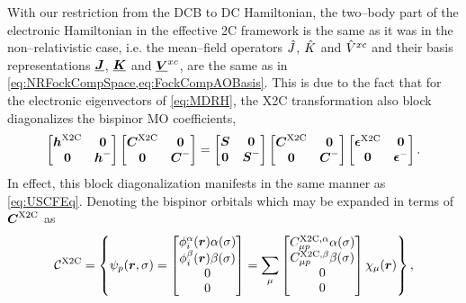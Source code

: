 With our restriction from the DCB to DC Hamiltonian,
the two--body part of the electronic Hamiltonian in the effective 2C framework
is the same as it was in the non--relativistic case, i.e. the mean--field operators
$\hat{J}$, $\hat{K}$ and $\hat{V}^{xc}$ and their basis representations $\boldsymbol{\underline{J}}$, $\boldsymbol{\underline{K}}$ and $\boldsymbol{\underline{V}}^{xc}$, are the same as in 
\cref{eq:NRFockCompSpace,eq:FockCompAOBasis}. This is due to the fact that for the electronic
eigenvectors of \cref{eq:MDRH}, the X2C transformation also block diagonalizes the 
bispinor MO coefficients,
\begin{equation}
\begin{bmatrix} \boldsymbol{h}^{\mathrm{X2C}} & \boldsymbol{0} \\ \boldsymbol{0} & \boldsymbol{h}^- \end{bmatrix}
\begin{bmatrix} \boldsymbol{C}^{\mathrm{X2C}} & \boldsymbol{0} \\ \boldsymbol{0} & \boldsymbol{C}^- \end{bmatrix} =
\begin{bmatrix} \boldsymbol{S} & \boldsymbol{0} \\ \boldsymbol{0} & \boldsymbol{S}^- \end{bmatrix}
\begin{bmatrix} \boldsymbol{C}^{\mathrm{X2C}} & \boldsymbol{0} \\ \boldsymbol{0} & \boldsymbol{C}^- \end{bmatrix} 
\begin{bmatrix} \boldsymbol{\epsilon}^{\mathrm{X2C}} & \boldsymbol{0} \\ \boldsymbol{0} & \boldsymbol{\epsilon}^- \end{bmatrix}.
\end{equation}
In effect, this block diagonalization manifests in the same manner as \cref{eq:USCFEq}. 
Denoting the bispinor orbitals which may be expanded in terms of 
$\boldsymbol{C}^{\mathrm{X2C}}$ as
\begin{equation}
  \mathcal C^{\mathrm{X2C}} = \left\lbrace
  \psi_p(\boldsymbol{r}, \sigma) = 
  \begin{bmatrix} \phi^\alpha_i (\boldsymbol{r}) \alpha(\sigma) \\ \phi^\beta_i(\boldsymbol{r}) \beta(\sigma) \\ 0 \\ 0 \end{bmatrix} =
  \sum_\mu \begin{bmatrix} C_{\mu p}^{\mathrm{X2C},\alpha} \alpha(\sigma)\\ C_{\mu p}^{\mathrm{X2C},\beta}\beta(\sigma) \\ 0 \\ 0 \end{bmatrix} \chi_\mu(\boldsymbol{r}) \right\rbrace, 
\end{equation}
